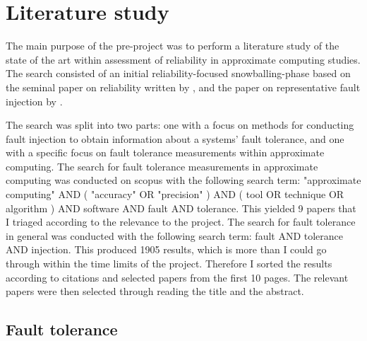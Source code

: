 \section{Literature study}




The main purpose of the pre-project was to perform a literature study of the state of the art within assessment of reliability in approximate computing studies. The search consisted of an initial reliability-focused snowballing-phase based on the seminal paper on reliability written by \citet{avizienis2004basic}, and the paper on representative fault injection by \citet{natella2016assessing}.


The search was split into two parts: one with a focus on methods for conducting fault injection to obtain information about a systems' fault tolerance, and one with a specific focus on fault tolerance measurements within approximate computing.
The search for fault tolerance measurements in approximate computing was conducted on scopus with the following search term:
"approximate computing" AND ( "accuracy" OR "precision" ) AND ( tool OR technique OR algorithm ) AND software AND fault AND tolerance.
This yielded 9 papers that I triaged according to the relevance to the project. 
The search for fault tolerance in general was conducted with the following search term: 
fault AND tolerance AND injection.
This produced 1905 results, which is more than I could go through within the time limits of the project. Therefore I sorted the results according to citations and selected papers from the first 10 pages. The relevant papers were then selected through reading the title and the abstract. 

\subsection{Fault tolerance}

